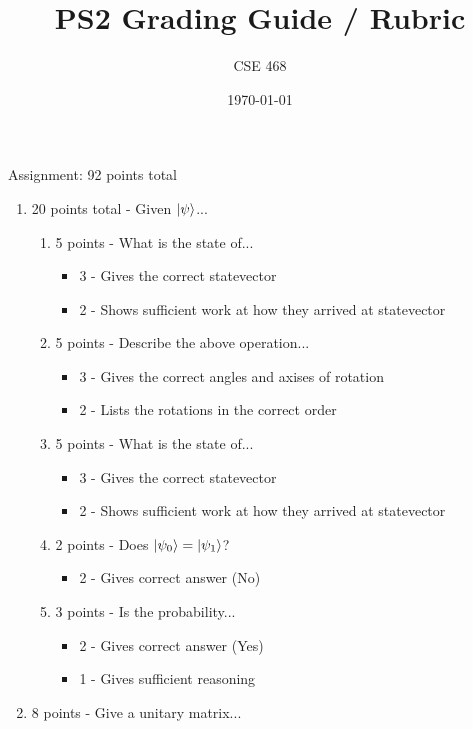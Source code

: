 \documentclass[12pt]{article}
\title{PS2 Grading Guide / Rubric}
\author{CSE 468}
\date{\today}
\begin{document}
\maketitle

Assignment: 92 points total
\begin{enumerate}[font=\bfseries]
    \item 20 points total - Given $\ket{\psi}$...
    \begin{enumerate}
        \item 5 points - What is the state of...
            \begin{itemize}
                \item 3 - Gives the correct statevector
                \item 2 - Shows sufficient work at how they arrived at statevector
            \end{itemize}
        \item 5 points - Describe the above operation...
            \begin{itemize}
                \item 3 - Gives the correct angles and axises of rotation
                \item 2 - Lists the rotations in the correct order
            \end{itemize}
        \item 5 points - What is the state of...
            \begin{itemize}
                \item 3 - Gives the correct statevector
                \item 2 - Shows sufficient work at how they arrived at statevector
            \end{itemize}
        \item 2 points - Does $\ket{\psi_0} = \ket{\psi_1}$?
            \begin{itemize}
                \item 2 - Gives correct answer (No)
            \end{itemize}
        \item 3 points - Is the probability...
            \begin{itemize}
                \item 2 - Gives correct answer (Yes)
                \item 1 - Gives sufficient reasoning
            \end{itemize}
    \end{enumerate}
    \item 8 points - Give a unitary matrix...

\end{enumerate}
\end{document}
